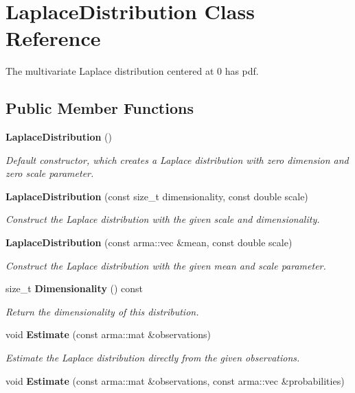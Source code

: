 \section{Laplace\+Distribution Class Reference}
\label{classmlpack_1_1distribution_1_1LaplaceDistribution}


The multivariate Laplace distribution centered at 0 has pdf.  


\subsection*{Public Member Functions}
\begin{DoxyCompactItemize}
\item 
\textbf{ Laplace\+Distribution} ()
\begin{DoxyCompactList}\small\item\em Default constructor, which creates a Laplace distribution with zero dimension and zero scale parameter. \end{DoxyCompactList}\item 
\textbf{ Laplace\+Distribution} (const size\+\_\+t dimensionality, const double scale)
\begin{DoxyCompactList}\small\item\em Construct the Laplace distribution with the given scale and dimensionality. \end{DoxyCompactList}\item 
\textbf{ Laplace\+Distribution} (const arma\+::vec \&mean, const double scale)
\begin{DoxyCompactList}\small\item\em Construct the Laplace distribution with the given mean and scale parameter. \end{DoxyCompactList}\item 
size\+\_\+t \textbf{ Dimensionality} () const
\begin{DoxyCompactList}\small\item\em Return the dimensionality of this distribution. \end{DoxyCompactList}\item 
void \textbf{ Estimate} (const arma\+::mat \&observations)
\begin{DoxyCompactList}\small\item\em Estimate the Laplace distribution directly from the given observations. \end{DoxyCompactList}\item 
void \textbf{ Estimate} (const arma\+::mat \&observations, const arma\+::vec \&probabilities)

\end{DoxyCompactItemize}
